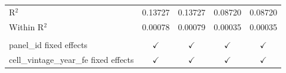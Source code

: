 \begin{tabular}{lcccc}
   R$^2$                                        & 0.13727         & 0.13727             & 0.08720                & 0.08720\\  
   Within R$^2$                                 & 0.00078         & 0.00079             & 0.00035                & 0.00035\\  
    \\
   panel\_id fixed effects                      & $\checkmark$    & $\checkmark$        & $\checkmark$           & $\checkmark$\\   
   cell\_vintage\_year\_fe fixed effects        & $\checkmark$    & $\checkmark$        & $\checkmark$           & $\checkmark$\\   
   \bottomrule
\end{tabular}
\par\endgroup


